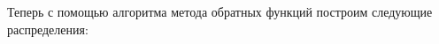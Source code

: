 \documentclass[a4paper,12pt, oneside]{book}
\begin{document}
{{\begin{center}
	\begin{minipage}[h]{0.4\linewidth}
	\end{minipage}
\end{center}


\vspace{15mm}
Теперь с помощью алгоритма метода обратных функций построим следующие распределения:

}}
\end{document}
